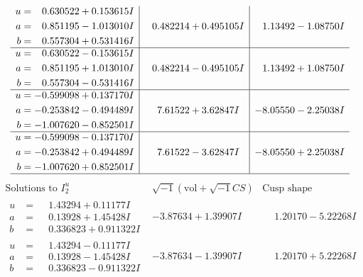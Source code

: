 \documentclass[1p]{elsarticle_modified}
\theoremstyle{definition}
\newcommand{\I}{\sqrt{-1}}
\begin{document}
$$\begin{array}{c|c|c}
\begin{aligned}
u &= \phantom{-}0.630522 + 0.153615 I \\
a &= \phantom{-}0.851195 - 1.013010 I \\
b &= \phantom{-}0.557304 + 0.531416 I\end{aligned}
 & \phantom{-}0.482214 + 0.495105 I & \phantom{-}1.13492 - 1.08750 I \\ \hline\begin{aligned}
u &= \phantom{-}0.630522 - 0.153615 I \\
a &= \phantom{-}0.851195 + 1.013010 I \\
b &= \phantom{-}0.557304 - 0.531416 I\end{aligned}
 & \phantom{-}0.482214 - 0.495105 I & \phantom{-}1.13492 + 1.08750 I \\ \hline\begin{aligned}
u &= -0.599098 + 0.137170 I \\
a &= -0.253842 - 0.494489 I \\
b &= -1.007620 - 0.852501 I\end{aligned}
 & \phantom{-}7.61522 + 3.62847 I & -8.05550 - 2.25038 I \\ \hline\begin{aligned}
u &= -0.599098 - 0.137170 I \\
a &= -0.253842 + 0.494489 I \\
b &= -1.007620 + 0.852501 I\end{aligned}
 & \phantom{-}7.61522 - 3.62847 I & -8.05550 + 2.25038 I\\
 \hline 
 \end{array}$$\newpage$$\begin{array}{c|c|c}  
\text{Solutions to }I^u_{2}& \I (\text{vol} + \sqrt{-1}CS) & \text{Cusp shape}\\
 \hline 
\begin{aligned}
u &= \phantom{-}1.43294 + 0.11177 I \\
a &= \phantom{-}0.13928 + 1.45428 I \\
b &= \phantom{-}0.336823 + 0.911322 I\end{aligned}
 & -3.87634 + 1.39907 I & \phantom{-}1.20170 - 5.22268 I \\ \hline\begin{aligned}
u &= \phantom{-}1.43294 - 0.11177 I \\
a &= \phantom{-}0.13928 - 1.45428 I \\
b &= \phantom{-}0.336823 - 0.911322 I\end{aligned}
 & -3.87634 - 1.39907 I & \phantom{-}1.20170 + 5.22268 I \\ \hline\begin{aligned}

\end{aligned}
\end{array}$$
\end{document}
